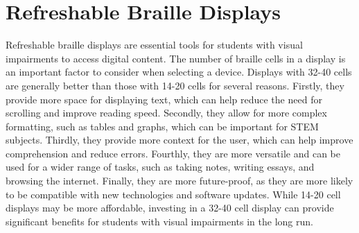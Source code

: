 \documentclass[12pt,letterpaper,twoside]{extreport}
\begin{document}
\pagebreak
\hypertarget{refreshable-braille-displays}{}\section{Refreshable Braille
  Displays}\label{refreshable-braille-displays}

Refreshable braille displays are essential tools for students with visual impairments to access digital content. The number of braille cells in a display is an important factor to consider when selecting a device. Displays with 32-40 cells are generally better than those with 14-20 cells for several reasons. Firstly, they provide more space for displaying text, which can help reduce the need for scrolling and improve reading speed. Secondly, they allow for more complex formatting, such as tables and graphs, which can be important for STEM subjects. Thirdly, they provide more context for the user, which can help improve comprehension and reduce errors. Fourthly, they are more versatile and can be used for a wider range of tasks, such as taking notes, writing essays, and browsing the internet. Finally, they are more future-proof, as they are more likely to be compatible with new technologies and software updates. While 14-20 cell displays may be more affordable, investing in a 32-40 cell display can provide significant benefits for students with visual impairments in the long run.
\end{document}
